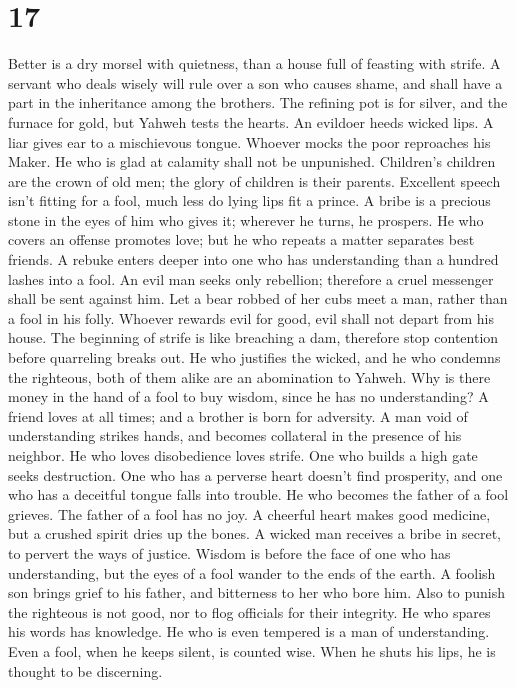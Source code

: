 \hypertarget{section-16}{%
\section{17}\label{section-16}}

 Better is a dry morsel with quietness, than a house full
of feasting with strife.  A servant who deals wisely will
rule over a son who causes shame, and shall have a part in the
inheritance among the brothers.  The refining pot is for
silver, and the furnace for gold, but Yahweh tests the hearts.
 An evildoer heeds wicked lips. A liar gives ear to a
mischievous tongue.  Whoever mocks the poor reproaches his
Maker. He who is glad at calamity shall not be unpunished.
 Children's children are the crown of old men; the glory
of children is their parents.  Excellent speech isn't
fitting for a fool, much less do lying lips fit a prince. 
A bribe is a precious stone in the eyes of him who gives it; wherever he
turns, he prospers.  He who covers an offense promotes
love; but he who repeats a matter separates best friends.
 A rebuke enters deeper into one who has understanding
than a hundred lashes into a fool.  An evil man seeks
only rebellion; therefore a cruel messenger shall be sent against him.
 Let a bear robbed of her cubs meet a man, rather than a
fool in his folly.  Whoever rewards evil for good, evil
shall not depart from his house.  The beginning of strife
is like breaching a dam, therefore stop contention before quarreling
breaks out.  He who justifies the wicked, and he who
condemns the righteous, both of them alike are an abomination to Yahweh.
 Why is there money in the hand of a fool to buy wisdom,
since he has no understanding?  A friend loves at all
times; and a brother is born for adversity.  A man void
of understanding strikes hands, and becomes collateral in the presence
of his neighbor.  He who loves disobedience loves strife.
One who builds a high gate seeks destruction.  One who
has a perverse heart doesn't find prosperity, and one who has a
deceitful tongue falls into trouble.  He who becomes the
father of a fool grieves. The father of a fool has no joy.
 A cheerful heart makes good medicine, but a crushed
spirit dries up the bones.  A wicked man receives a bribe
in secret, to pervert the ways of justice.  Wisdom is
before the face of one who has understanding, but the eyes of a fool
wander to the ends of the earth.  A foolish son brings
grief to his father, and bitterness to her who bore him. 
Also to punish the righteous is not good, nor to flog officials for
their integrity.  He who spares his words has knowledge.
He who is even tempered is a man of understanding.  Even
a fool, when he keeps silent, is counted wise. When he shuts his lips,
he is thought to be discerning.


